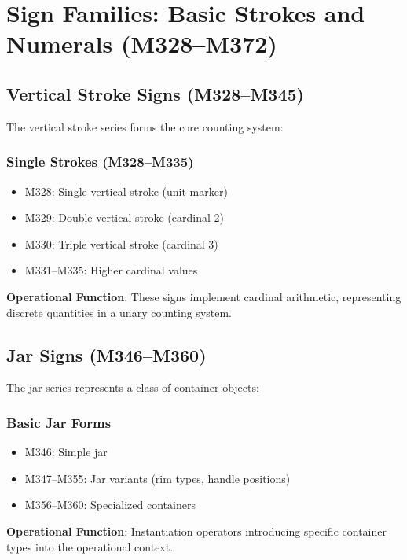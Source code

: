 \section{Sign Families: Basic Strokes and Numerals (M328--M372)}

\subsection{Vertical Stroke Signs (M328--M345)}

The vertical stroke series forms the core counting system:

\subsubsection{Single Strokes (M328--M335)}
\begin{itemize}
    \item M328: Single vertical stroke (unit marker)
    \item M329: Double vertical stroke (cardinal 2)
    \item M330: Triple vertical stroke (cardinal 3)
    \item M331--M335: Higher cardinal values
\end{itemize}

\textbf{Operational Function}: These signs implement cardinal arithmetic, representing discrete quantities in a unary counting system.

\subsection{Jar Signs (M346--M360)}

The jar series represents a class of container objects:

\subsubsection{Basic Jar Forms}
\begin{itemize}
    \item M346: Simple jar
    \item M347--M355: Jar variants (rim types, handle positions)
    \item M356--M360: Specialized containers
\end{itemize}

\textbf{Operational Function}: Instantiation operators introducing specific container types into the operational context.

